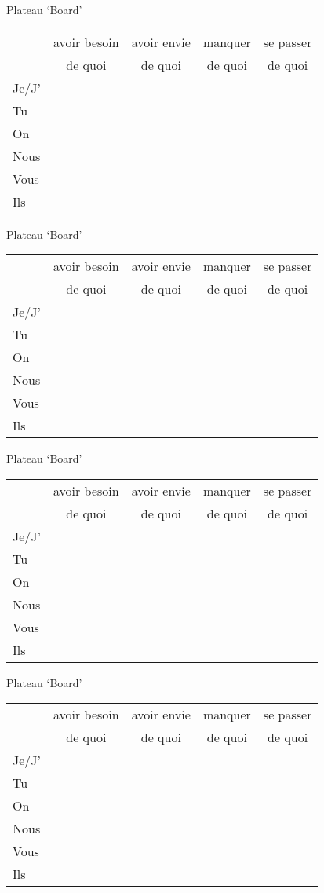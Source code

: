 \documentclass{article}
\date{}
\newcommand{\plateau}{
    \Large
    Plateau `Board' \\
    \begin{tabular}{| l | c | c | c | c |}
      \hline
                & avoir besoin & avoir envie & manquer & se passer \\
                & de quoi      & de quoi     & de quoi & de quoi \\
      \hline
      Je/J'     &              &             &         & \\
      \hline
      Tu        &              &             &         & \\
      \hline
      On        &              &             &         & \\
      \hline
      Nous      &              &             &         & \\
      \hline
      Vous      &              &             &         & \\
      \hline
      Ils       &              &             &         & \\
      \hline
    \end{tabular}
  }
\begin{document}
  \centering
  \noindent
  \plateau

  \plateau

  \plateau

  \plateau
\end{document}
